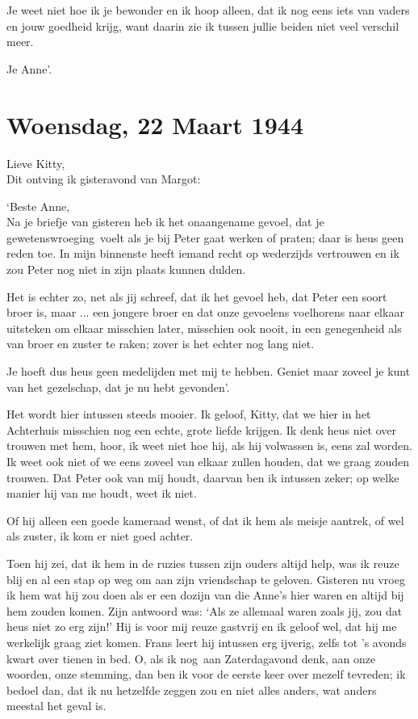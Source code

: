 \documentclass{book}
\begin{document}
Je weet niet hoe ik je bewonder en ik hoop alleen, dat ik nog eens iets van
vaders en jouw goedheid krijg, want daarin zie ik tussen jullie beiden niet veel
verschil meer.

Je Anne'.

\section*{Woensdag, 22 Maart 1944}

Lieve Kitty,\\
Dit ontving ik gisteravond van Margot:

`Beste Anne,\\
Na je briefje van gisteren heb ik het onaangename gevoel, dat je
gewetenswroeging~voelt als je bij Peter gaat werken of praten; daar is heus geen
reden toe. In mijn binnenste heeft iemand recht op wederzijds vertrouwen en ik
zou Peter nog niet in zijn plaats kunnen dulden.

Het is echter zo, net als jij schreef, dat ik het gevoel heb, dat Peter een
soort broer is, maar ... een jongere broer en dat onze gevoelens voelhorens naar
elkaar uitsteken om elkaar misschien later, misschien ook nooit, in een
genegenheid als van broer en zuster te raken; zover is het echter nog lang niet.

Je hoeft dus heus geen medelijden met mij te hebben. Geniet maar zoveel je kunt
van het gezelschap, dat je nu hebt gevonden'.

Het wordt hier intussen steeds mooier. Ik geloof, Kitty, dat we hier in het
Achterhuis misschien nog een echte, grote liefde krijgen. Ik denk heus niet over
trouwen met hem, hoor, ik weet niet hoe hij, als hij volwassen is, eens zal
worden. Ik weet ook niet of we eens zoveel van elkaar zullen houden, dat we
graag zouden trouwen. Dat Peter ook van mij houdt, daarvan ben ik intussen
zeker; op welke manier hij van me houdt, weet ik niet.

Of hij alleen een goede kameraad wenst, of dat ik hem als meisje aantrek, of wel
als zuster, ik kom er niet goed achter.

Toen hij zei, dat ik hem in de ruzies tussen zijn ouders altijd help, was ik
reuze blij en al een stap op weg om aan zijn vriendschap te geloven. Gisteren nu
vroeg ik hem wat hij zou doen als er een dozijn van die Anne's hier waren en
altijd bij hem zouden komen. Zijn antwoord was: `Als ze allemaal waren zoals
jij, zou dat heus niet zo erg zijn!' Hij is voor mij reuze gastvrij en ik geloof
wel, dat hij me werkelijk graag ziet komen. Frans leert hij intussen erg
ijverig, zelfs tot 's avonds kwart over tienen in bed. O, als ik nog~aan
Zaterdagavond denk, aan onze woorden, onze stemming, dan ben ik voor de eerste
keer over mezelf tevreden; ik bedoel dan, dat ik nu hetzelfde zeggen zou en niet
alles anders, wat anders meestal het geval is.
\end{document}
